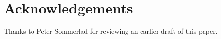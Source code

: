 \section*{Acknowledgements}

Thanks to Peter Sommerlad for reviewing an earlier draft of this paper.
